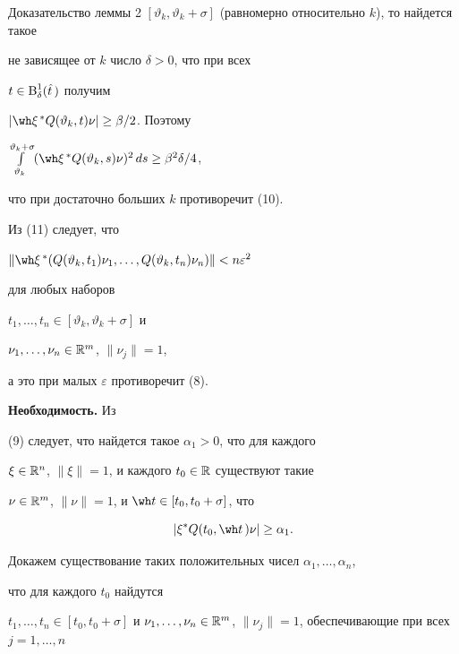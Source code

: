 \begin{pf*}{Доказательство леммы 2}
$[\vartheta_k,\vartheta_k+\sigma]$ (равномерно относительно $k$), то найдется такое


не зависящее от $k$ число $\delta>0$, что при всех


$t\in\operatorname{B}_{\delta}^1(\hat t\,)$ получим


$|\wh\xi^{\,*}Q(\vartheta_k,t)\nu|\ge\beta/2$. Поэтому


$\int\limits_{\vartheta_k}^{\vartheta_k+\sigma}


(\wh\xi^{\,*}Q(\vartheta_k,s)\nu)^2\,ds


\ge\beta^2\delta/4$,


что при достаточно больших $k$ противоречит (10).





Из (11) следует, что


$\|\wh\xi^{\,*}(Q(\vartheta_{k},t_{1})\nu_{1},


\dotsc,Q(\vartheta_{k},t_{n})\nu_{n})\|<n\varepsilon^{2}$


для любых наборов


$t_{1},\dotsc,t_{n}\in[\vartheta_{k},\vartheta_{k}+\sigma]$ и


$\nu_{1},\dotsc,\nu_{n}\in\Bbb R^m$, $\|\nu_{j}\|=1$,


а это при малых $\varepsilon$ противоречит (8).


\medskip





{\bf Необходимость.} Из


(9) следует, что найдется такое $\alpha_{1}>0$, что для каждого


$\xi\in\Bbb R^n$, $\|\xi\|=1$, и каждого $t_{0}\in\Bbb R$ существуют такие


$\nu\in\Bbb R^m$, $\|\nu\|=1$, и $\wh t\in [t_{0},t_{0}+\sigma]$, что


\begin{equation}


|\xi^{*}Q(t_{0},\wh t\,)\nu|\ge\alpha_{1}.


\end{equation}


Докажем существование таких положительных чисел $\alpha_{1},\dotsc,\alpha_{n}$,


что для каждого $t_{0}$ найдутся


$t_{1},\dotsc,t_{n}\in[t_{0},t_{0}+\sigma]$ и $\nu_{1},\dotsc,\nu_{n}\in


\Rp^m$, $\|\nu_{j}\|=1$, обеспечивающие при всех $j=1,\dotsc,n$



\end{pf*}
